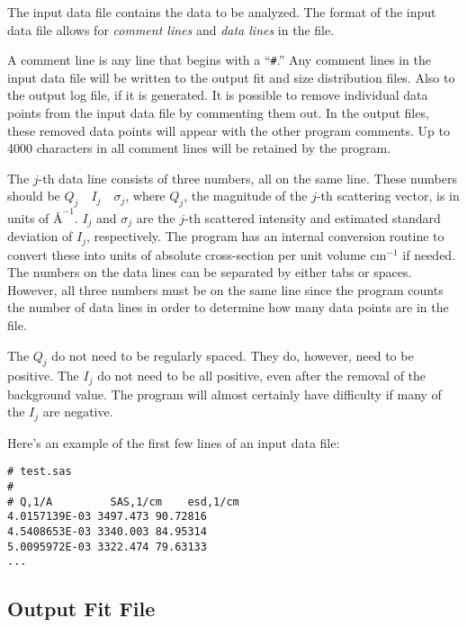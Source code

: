 \documentclass[letterpaper]{article}
\newlength{\fminilength}
\newenvironment{fminipage}[1][\linewidth]
 {\setlength{\fminilength}{#1}%
    \addtolength{\fminilength}{-2\fboxsep}%
    \addtolength{\fminilength}{-2\fboxrule}%
    \begin{lrbox}{\fminibox}\begin{minipage}{\fminilength}}
 {\end{minipage}\end{lrbox}\noindent\fbox{\usebox{\fminibox}}}
\begin{document}
The input data file contains the data to be analyzed.
The format of the input data file allows for \emph{comment 
lines} and \emph{data lines} in the file.  

A comment line is 
any line that begins with a ``\verb|#|.''  Any 
comment lines in the input data file will be written 
to the output fit and size distribution files.  Also 
to the output log file, if it is generated.  It is 
possible to remove individual data points from the input data 
file by commenting them out.  In the output files, 
these removed data points will appear with the other 
program comments.  Up to 4000 characters 
in all comment lines will be retained by the program.

The $j$-th data 
line consists of three numbers, all on the same 
line.  These numbers should be $Q_j \quad I_j \quad 
\sigma_j$, where $Q_j$, the magnitude of the $j$-th scattering 
vector, is in units of $\mbox{\AA}^{-1}$.  $I_j$ and 
$\sigma_j$ are the $j$-th scattered intensity and estimated 
standard deviation of $I_j$, respectively.  The program 
has an internal conversion routine to convert these 
into units of absolute cross-section per unit 
volume $\mbox{cm}^{-1}$
if needed.  The numbers on the data lines can be 
separated by either tabs or spaces.  However, all 
three numbers must be on the same line since the 
program counts the number of data lines in order to 
determine how many data points are in the file.

The $Q_j$ do not need to be regularly spaced.  
They do, however, need to be positive.  The $I_j$ do 
not need to be all positive, even after the removal 
of the background value.  The program will almost 
certainly have difficulty if many of the $I_j$ are 
negative.

Here's an example of the first few lines of an input 
data file: \par
\begin{center}
\begin{fminipage}[0.6\linewidth]
\small\begin{verbatim}
# test.sas
#
# Q,1/A         SAS,1/cm    esd,1/cm
4.0157139E-03 3497.473 90.72816 
4.5408653E-03 3340.003 84.95314 
5.0095972E-03 3322.474 79.63133 
...
\end{verbatim}
\end{fminipage}
\end{center}

\subsection{Output Fit File}
\end{document}
